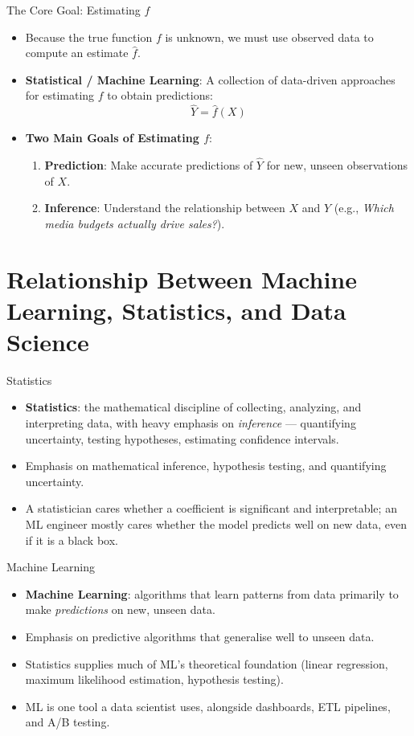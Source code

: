 \begin{frame}{The Core Goal: Estimating $f$}
    \begin{itemize}
        \item Because the true function $f$ is unknown, we must use observed data to compute an estimate $\hat{f}$.
        \item \textbf{Statistical / Machine Learning}: A collection of data-driven approaches for estimating $f$ to obtain predictions:
        $$\hat{Y} = \hat{f}(X)$$
        \item \textbf{Two Main Goals of Estimating $f$}:
        \begin{enumerate}
            \item \textbf{Prediction}: Make accurate predictions of $\hat{Y}$ for new, unseen observations of $X$.
            \item \textbf{Inference}: Understand the relationship between $X$ and $Y$ (e.g., \emph{Which media budgets actually drive sales?}).
        \end{enumerate}
    \end{itemize}
\end{frame}


\section{Relationship Between Machine Learning, Statistics, and Data Science}


\begin{frame}{Statistics}
	\begin{itemize}
		\item \textbf{Statistics}: the mathematical discipline of collecting, analyzing, and interpreting data, with heavy emphasis on \emph{inference} --- quantifying uncertainty, testing hypotheses, estimating confidence intervals.
		\item Emphasis on mathematical inference, hypothesis testing, and quantifying uncertainty.
		\item A statistician cares whether a coefficient is significant and interpretable; an ML engineer mostly cares whether the model predicts well on new data, even if it is a black box.
	\end{itemize}
\end{frame}


\begin{frame}{Machine Learning}
	\begin{itemize}
		\item \textbf{Machine Learning}: algorithms that learn patterns from data primarily to make \emph{predictions} on new, unseen data.
		\item Emphasis on predictive algorithms that generalise well to unseen data.
		\item Statistics supplies much of ML's theoretical foundation (linear regression, maximum likelihood estimation, hypothesis testing).
		\item ML is one tool a data scientist uses, alongside dashboards, ETL pipelines, and A/B testing.
	\end{itemize}
\end{frame}


